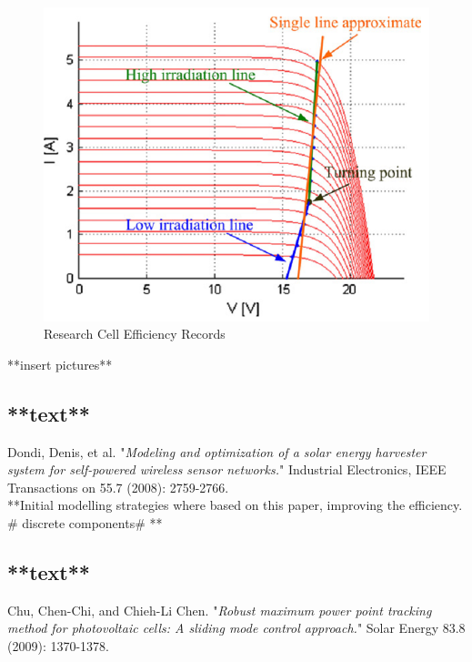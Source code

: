  \begin{figure}[H]
  \begin{center}
  \includegraphics[width=\textwidth]{images/IVCurve_lui_2}
  \caption{Research Cell Efficiency Records \cite{liu2011fast} }
  \label{fig:Lui_IV_2}
  \end{center}
  \end{figure}





**insert pictures**

\subsection{**text**\cite{dondi2008modeling}}

Dondi, Denis, et al. "\textit{Modeling and optimization of a solar energy harvester system for self-powered wireless sensor networks.}" Industrial Electronics, IEEE Transactions on 55.7 (2008): 2759-2766.\\


**Initial modelling strategies where based on this paper,  improving the efficiency. \# discrete components\# ** 

\subsection{**text**\cite{chu2009robust}}
Chu, Chen-Chi, and Chieh-Li Chen. "\textit{Robust maximum power point tracking method for photovoltaic cells: A sliding mode control approach.}" Solar Energy 83.8 (2009): 1370-1378.\\

